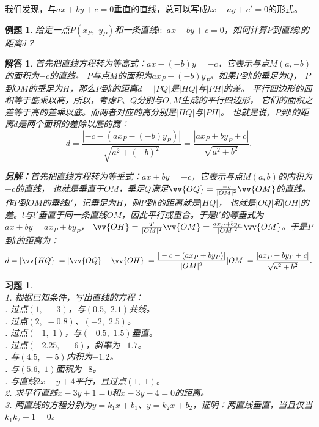 \documentclass[12pt,UTF8]{ctexbook}
\newtheorem{et}{例题}[section]
\newtheorem*{so}{解答}
\newtheorem{xt}{习题}[section]
\begin{document}
我们发现，与$ax + by + c = 0$垂直的直线，总可以写成$bx - ay + c' = 0$的形式。

\begin{et}
    给定一点$P(x_P, \,\,y_P)$和一条直线$l: \,\, ax + by + c = 0$，如何计算$P$到直线$l$的距离$d$？
\end{et}
\begin{so}
    首先把直线方程转为等高式：$ax - (-b)y = -c$，它表示与点$M(a, -b)$的面积为$-c$的直线。
$P$与点$M$的面积为$ax_P - (-b)y_P$。如果$P$到$l$的垂足为$Q$，
$P$到$OM$的垂足为$H$，那么$P$到$l$的距离$d = |PQ|$是$|HQ|$与$|PH|$的差。
平行四边形的面积等于底乘以高，所以，考虑$P$、$Q$分别与$O, M$生成的平行四边形，
它们的面积之差等于高的差乘以底。而两者对应的高分别是$|HQ|$与$|PH|$。
也就是说，$P$到$l$的距离$d$是两个面积的差除以底的商：
$$ d = \frac{|-c - (ax_P - (-b)y_P)|}{\sqrt{a^2 + (-b)^2}} = \frac{|ax_P + by_P + c|}{\sqrt{a^2 + b^2}}.$$

\textbf{另解：}首先把直线方程转为等垂式：$ax + by = -c$，它表示与点$M(a, b)$的内积为$-c$的直线，
也就是垂直于$OM$，垂足$Q$满足$\vv{OQ} = \frac{-c}{|OM|^2}\vv{OM}$的直线。作$P$到$OM$的垂线$l'$，记垂足为$H$，则$P$到$l$的距离就是$|HQ|$，
也就是$|OQ|$和$|OH|$的差。$l$与$l'$垂直于同一条直线$OM$，因此平行或重合。于是$l'$的等垂式为$ax + by = ax_P + by_P$，
$\vv{OH} = \frac{T}{|OM|^2}\vv{OM} = \frac{ax_P + by_P}{|OM|^2}\vv{OM}$。于是$P$到$l$的距离为：
$$ d = |\vv{HQ}| = |\vv{OQ} - \vv{OH}| = \frac{|-c - (ax_P + by_P)|}{|OM|^2} |OM| = \frac{|ax_P + by_P + c|}{\sqrt{a^2 + b^2}}. $$
\end{so}

\begin{xt}
    \mbox{}\\
    1. 根据已知条件，写出直线的方程：\\
    . 过点$(1, \,\,-3)$，与$(0.5, \,\,2.1)$共线。\\
    . 过点$(2, \,\,-0.8)$、$(-2, \,\,2.5)$。\\
    . 过点$(-1, \,\,1)$，与$(-0.5, \,\,1.5)$垂直。\\
    . 过点$(-2.25, \,\,-6)$，斜率为$-1.7$。\\
    . 与$(4.5,\,\, -5)$内积为$-1.2$。\\
    . 与$(5.6, \,\,1)$面积为$-8$。\\
    . 与直线$2x - y + 4$平行，且过点$(1, \,\, 1)$。 \\
    2. 求平行直线$x - 3y + 1 = 0$和$x - 3y - 4 = 0$的距离。 \\
    3. 两直线的方程分别为$y = k_1 x + b_1$、$y = k_2 x + b_2$，证明：两直线垂直，当且仅当$k_1k_2 + 1 = 0$。
\end{xt}
\end{document}
